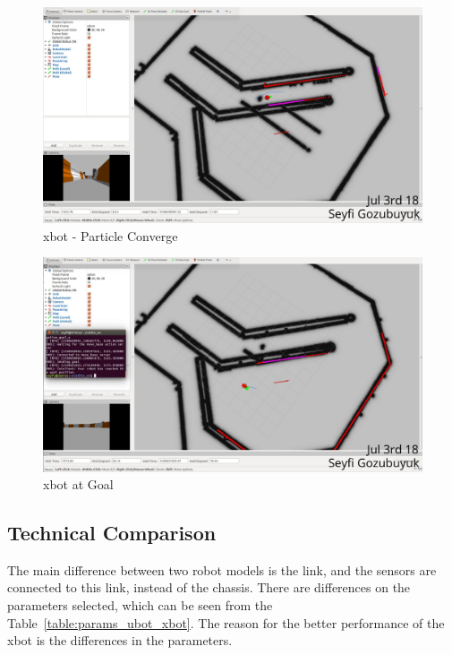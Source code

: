 \documentclass[10pt,journal,compsoc]{IEEEtran}
\begin{document}
\begin{figure}[thpb]
      \centering
      \includegraphics[width=\linewidth]{figures/xbotConv.png}
      \caption{xbot - Particle Converge}
      \label{fig:xbotconv}
\end{figure}

\begin{figure}[thpb]
      \centering
      \includegraphics[width=\linewidth]{figures/xbotGoal.png}
      \caption{xbot at Goal}
      \label{fig:xbotgoal}
\end{figure}

\subsection{Technical Comparison} %
The main difference between two robot models is the \textunderscore link, and the sensors are connected to this link, instead of the chassis. There are differences on the parameters selected, which can be seen from the Table~\ref{table:params_ubot_xbot}. The reason for the better performance of the xbot is the differences in the parameters.
\end{document}
